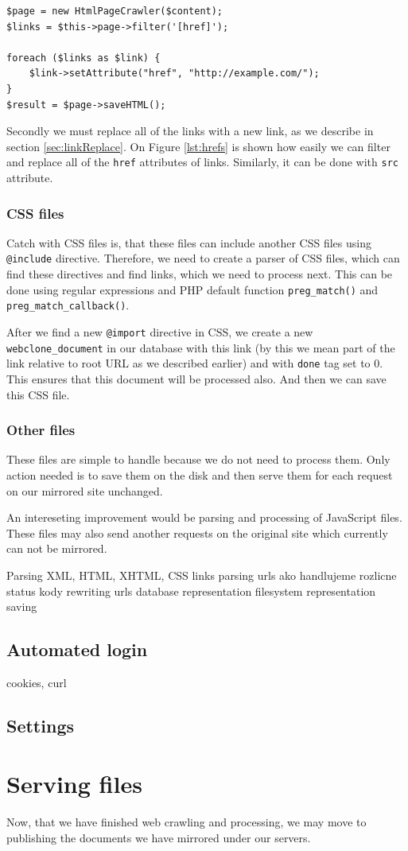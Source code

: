 \begin{lstlisting}[caption={Example of finding and replacing href attributes in an HTML document},label={lst:hrefs}]
$page = new HtmlPageCrawler($content);
$links = $this->page->filter('[href]');

foreach ($links as $link) {
	$link->setAttribute("href", "http://example.com/");
}
$result = $page->saveHTML();
\end{lstlisting}

Secondly we must replace all of the links with a new link, as we describe in section \ref{sec:linkReplace}. On Figure \ref{lst:hrefs} is shown how easily we can filter and replace all of the \texttt{href} attributes of links. Similarly, it can be done with \texttt{src} attribute.

\subsubsection{CSS files}
Catch with CSS files is, that these files can include another CSS files using \texttt{@include} directive. Therefore, we need to create a parser of CSS files, which can find these directives and find links, which we need to process next. This can be done using regular expressions and PHP default function \texttt{preg\_match()} and \texttt{preg\_match\_callback()}.

After we find a new \texttt{@import} directive in CSS, we create a new \texttt{webclone\_document} in our database with this link (by this we mean part of the link relative to root URL as we described earlier) and with \texttt{done} tag set to 0. This ensures that this document will be processed also. And then we can save this CSS file.

\subsubsection{Other files}
These files are simple to handle because we do not need to process them. Only action needed is to save them on the disk and then serve them for each request on our mirrored site unchanged.

An intereseting improvement would be parsing and processing of JavaScript files. These files may also send another requests on the original site which currently can not be mirrored.


Parsing XML, HTML, XHTML, CSS links
parsing urls
ako handlujeme rozlicne status kody
rewriting urls
database representation
filesystem representation
saving

\subsection{Automated login}
\label{sec:login}
cookies, curl


\subsection{Settings}


\section{Serving files}
\label{sec:serving}
Now, that we have finished web crawling and processing, we may move to publishing the documents we have mirrored under our servers.



